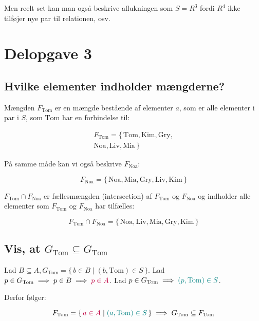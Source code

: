 Men reelt set kan man også beskrive aflukningen som \(S = R^{3}\) fordi \(R^4\) ikke tilføjer nye par til
relationen, osv.


\section{Delopgave 3}\label{sec:delopgave-3}

\subsection{Hvilke elementer indholder mængderne?}\label{subsec:hvilke-elementer-indholder-mngderne?}

Mængden \(F_{\text{Tom}}\) er en mængde bestående af elementer \(a\), som er alle elementer i par i \(S\), som
\(\text{Tom}\) har en forbindelse til:

\begin{equation}
    \begin{split}
        F_{\text{Tom}} = \{\,\text{Tom}, \text{Kim}, \text{Gry}, \\
        \text{Noa}, \text{Liv}, \text{Mia}\,\}
    \end{split}\label{eq:equation9}
\end{equation}

På samme måde kan vi også beskrive \(F_{\text{Noa}}\):

\begin{equation}
    F_{\text{Noa}} = \{\,\text{Noa}, \text{Mia}, \text{Gry}, \text{Liv}, \text{Kim}\,\}\label{eq:equation8}
\end{equation}

\(F_{\text{Tom}} \cap F_{\text{Noa}}\) er fællesmængden (intersection) af \(F_{\text{Tom}}\) og \(F_{\text{Noa}}\)
og indholder alle elementer som \(F_{\text{Tom}}\) og \(F_{\text{Noa}}\) har tilfælles:

\begin{equation}
    F_{\text{Tom}} \cap F_{\text{Noa}} = \{\,\text{Noa}, \text{Liv}, \text{Mia}, \text{Gry}, \text{Kim}\,\}
    \label{eq:equation10}
\end{equation}

\subsection{Vis, at \(G_{\text{Tom}} \subseteq G_{\text{Tom}}\)}
\label{subsec:vis-at-(g_{text{tom}}-subseteq-g_{text{tom}})}


Lad \(B \subseteq A, G_{\text{Tom}} = \{\,b \in B \mid (b, \text{Tom}) \in S\,\}\label{eq:equation11}\).
Lad \(p \in G_{\text{Tom}} \implies p \in B \implies \textcolor{purple}{p \in A}\).
Lad \(p \in G_{\text{Tom}} \implies \textcolor{teal}{(p, \text{Tom}) \in S}\).

Derfor følger:

\begin{equation}
    F_{\text{Tom}} = \{\,\textcolor{purple}{a \in A} \mid \textcolor{teal}{(a, \text{Tom}) \in S}\,\} \implies
    G_{\text{Tom}} \subseteq F_{\text{Tom}}\label{eq:equation2}
\end{equation}
